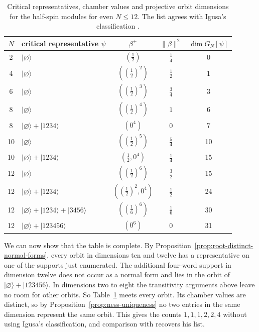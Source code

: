 \documentclass{article}
\theoremstyle{definition}
\theoremstyle{remark}
\newcommand{\ket}[1]{\lvert #1\rangle}
\newcommand{\norm}[1]{\lVert #1\rVert}
\begin{document}
\begin{table}[t]
\centering
\renewcommand{\arraystretch}{1.15}
\small
\begin{tabular}{c l c c c}
\toprule
$N$ & critical representative $\psi$ & $\beta^+$ &
$\norm\beta^2$ & $\dim G_N[\psi]$\\
\midrule
2  & $\ket\varnothing$ & $(\frac12)$ & $\frac14$ & 0\\
4  & $\ket\varnothing$ & $((\frac12)^2)$ & $\frac12$ & 1\\
6  & $\ket\varnothing$ & $((\frac12)^3)$ & $\frac34$ & 3\\
\midrule
8  & $\ket\varnothing$ & $((\frac12)^4)$ & $1$ & 6\\
8  & $\ket\varnothing+\ket{1234}$ & $(0^4)$ & $0$ & 7\\
\midrule
10 & $\ket\varnothing$ & $((\frac12)^5)$ & $\frac54$ & 10\\
10 & $\ket\varnothing+\ket{1234}$ & $(\frac12,0^4)$ & $\frac14$ & 15\\
\midrule
12 & $\ket\varnothing$ & $((\frac12)^6)$ & $\frac32$ & 15\\
12 & $\ket\varnothing+\ket{1234}$ & $((\frac12)^2,0^4)$ & $\frac12$ & 24\\
12 & $\ket\varnothing+\ket{1234}+\ket{3456}$ & $((\frac16)^6)$ & $\frac16$ & 30\\
12 & $\ket\varnothing+\ket{123456}$ & $(0^6)$ & $0$ & 31\\
\bottomrule
\end{tabular}
\caption{Critical representatives, chamber values and projective orbit dimensions
for the half-spin modules for even $N\le 12$. The list agrees with Igusa's
classification \cite{Igusa1970uptodim12}.}
\label{tab:finite-even-low}
\end{table}

We can now show that the table is complete. By
Proposition~\ref{prop:root-distinct-normal-forms}, every orbit in dimensions
ten and twelve has a representative on one of the supports just enumerated.
The additional four-word support in dimension twelve does not occur as a
normal form and lies in the orbit of $\ket\varnothing+\ket{123456}$. In dimensions two to eight the transitivity arguments above leave no room for
other orbits. So Table~\ref{tab:finite-even-low} meets every orbit. Its
chamber values are distinct, so by Proposition~\ref{prop:ness-uniqueness} no
two entries in the same dimension represent the same orbit. This gives the
counts $1,1,1,2,2,4$ without using Igusa's classification, and comparison with
\cite{Igusa1970uptodim12} recovers his list.
\end{document}
